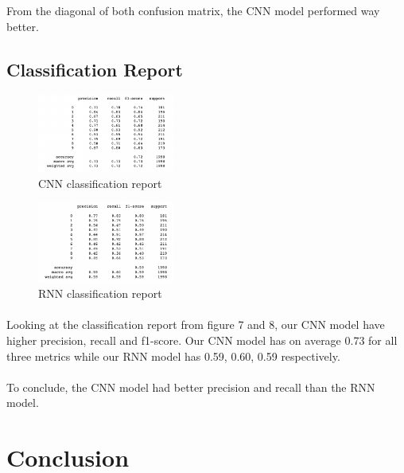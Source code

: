     From the diagonal of both confusion matrix, the CNN model performed way better.
    
    \subsection{Classification Report}
    \begin{figure}[H]
        \centering
        \includegraphics[width=0.4\textwidth]{images/cnn_classification_report.png} 
        \caption{CNN classification report}
    \end{figure}

    \begin{figure}[H]
        \centering
        \includegraphics[width=0.4\textwidth]{images/rnn_classification_report.png} 
        \caption{RNN classification report}
    \end{figure}
    
    \paragraph{}
    Looking at the classification report from figure 7 and 8, our CNN model have higher precision, recall and f1-score. Our CNN model has on average 0.73 for all three metrics while our RNN model has 0.59, 0.60, 0.59 respectively.
    
    \paragraph{}
    To conclude, the CNN model had better precision and recall than the RNN model.
    
\section{Conclusion}
